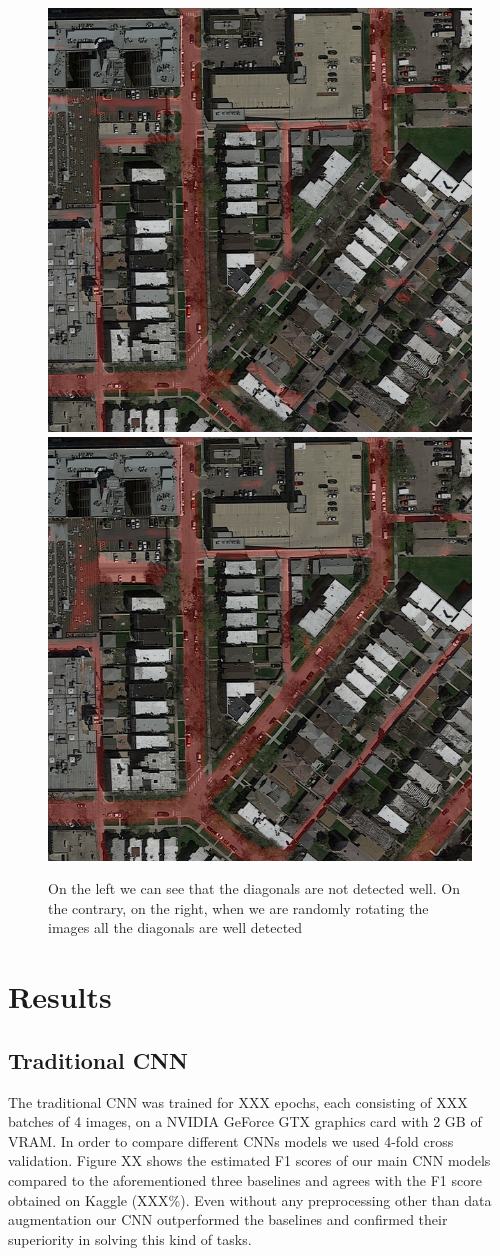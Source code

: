 \documentclass[10pt,conference,compsocconf]{IEEEtran}
\begin{document}
\begin{figure}[h]
 \centering
 \includegraphics[width=0.35\columnwidth]{img/diagonals.png}
 \includegraphics[width=0.35\columnwidth]{img/diagonals_corrected.png}
 \caption{On the left we can see that the diagonals are not detected well. On the contrary, on the right, when we are randomly rotating the images all the diagonals are well detected}
 \vspace{-3mm}
 \label{fig:diagonal}
\end{figure}

\section{Results}
\label{sec:results}
\subsection{Traditional CNN}
	The traditional CNN was trained for XXX epochs, each consisting of XXX batches of 4 images, on a NVIDIA GeForce GTX graphics card with 2 GB of VRAM. 
	In order to compare different CNNs models we used 4-fold cross validation. Figure XX shows the estimated F1 scores of our main CNN models compared to the aforementioned three baselines and agrees with the F1 score obtained on Kaggle (XXX\%). Even without any preprocessing other than data augmentation our CNN outperformed the baselines and confirmed their superiority in solving this kind of tasks.
\end{document}
